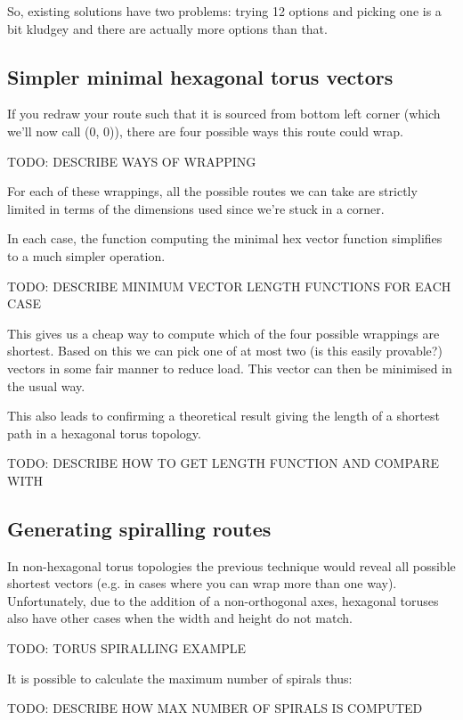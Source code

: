 		So, existing solutions have two problems: trying 12 options and picking one
		is a bit kludgey and there are actually more options than that.
		
		\subsection{Simpler minimal hexagonal torus vectors}
			
			If you redraw your route such that it is sourced from bottom left corner
			(which we'll now call (0, 0)), there are four possible ways this route
			could wrap.
			
			TODO: DESCRIBE WAYS OF WRAPPING
			
			For each of these wrappings, all the possible routes we can take are
			strictly limited in terms of the dimensions used since we're stuck in a
			corner.
			
			In each case, the function computing the minimal hex vector function
			simplifies to a much simpler operation.
			
			TODO: DESCRIBE MINIMUM VECTOR LENGTH FUNCTIONS FOR EACH CASE
			
			This gives us a cheap way to compute which of the four possible wrappings
			are shortest. Based on this we can pick one of at most two (is this
			easily provable?) vectors in some fair manner to reduce load. This vector
			can then be minimised in the usual way.
			
			This also leads to confirming a theoretical result giving the length of a
			shortest path in a hexagonal torus topology.
			
			TODO: DESCRIBE HOW TO GET LENGTH FUNCTION AND COMPARE WITH \cite{xiao04}
		
		\subsection{Generating spiralling routes}
			
			In non-hexagonal torus topologies the previous technique would reveal all
			possible shortest vectors (e.g. in cases where you can wrap more than one
			way). Unfortunately, due to the addition of a non-orthogonal axes,
			hexagonal toruses also have other cases when the width and height do not
			match.
			
			TODO: TORUS SPIRALLING EXAMPLE
			
			It is possible to calculate the maximum number of spirals thus:
			
			TODO: DESCRIBE HOW MAX NUMBER OF SPIRALS IS COMPUTED
			
